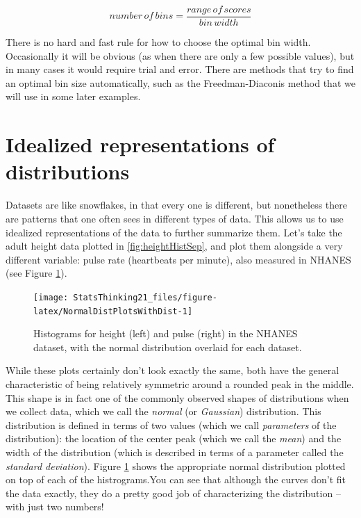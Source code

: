 \documentclass[12pt,]{book}
\theoremstyle{definition}
\theoremstyle{definition}
\theoremstyle{definition}
\theoremstyle{remark}
\begin{document}
\[
number\, of\, bins  = \frac{range\, of\, scores}{bin\, width}
\]

There is no hard and fast rule for how to choose the optimal bin width. Occasionally it will be obvious (as when there are only a few possible values), but in many cases it would require trial and error. There are methods that try to find an optimal bin size automatically, such as the Freedman-Diaconis method that we will use in some later examples.

\hypertarget{idealized-representations-of-distributions}{%
\section{Idealized representations of distributions}\label{idealized-representations-of-distributions}}

Datasets are like snowflakes, in that every one is different, but nonetheless there are patterns that one often sees in different types of data. This allows us to use idealized representations of the data to further summarize them. Let's take the adult height data plotted in \ref{fig:heightHistSep}, and plot them alongside a very different variable: pulse rate (heartbeats per minute), also measured in NHANES (see Figure \ref{fig:NormalDistPlotsWithDist}).

\begin{figure}
\texttt{[image: StatsThinking21\_files/figure-latex/NormalDistPlotsWithDist-1]} \caption{Histograms for height (left) and pulse (right) in the NHANES dataset, with the normal distribution overlaid for each dataset.}\label{fig:NormalDistPlotsWithDist}
\end{figure}

While these plots certainly don't look exactly the same, both have the general characteristic of being relatively symmetric around a rounded peak in the middle. This shape is in fact one of the commonly observed shapes of distributions when we collect data, which we call the \emph{normal} (or \emph{Gaussian}) distribution. This distribution is defined in terms of two values (which we call \emph{parameters} of the distribution): the location of the center peak (which we call the \emph{mean}) and the width of the distribution (which is described in terms of a parameter called the \emph{standard deviation}). Figure \ref{fig:NormalDistPlotsWithDist} shows the appropriate normal distribution plotted on top of each of the histrograms.You can see that although the curves don't fit the data exactly, they do a pretty good job of characterizing the distribution -- with just two numbers!
\end{document}
